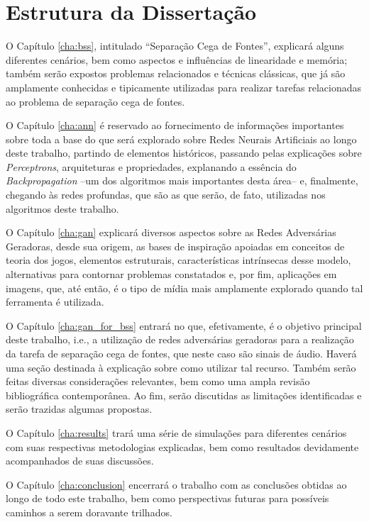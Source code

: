 \section{Estrutura da Dissertação}
\label{sec:intro_dissertation_structure}

O Capítulo \ref{cha:bss}, intitulado ``Separação Cega de Fontes'', explicará alguns diferentes cenários, bem como aspectos e influências de linearidade e memória; também  serão expostos problemas relacionados e técnicas clássicas, que já são amplamente conhecidas e tipicamente utilizadas para realizar tarefas relacionadas ao problema de separação cega de fontes.

O Capítulo \ref{cha:ann} é reservado ao fornecimento de informações importantes sobre toda a base do que será explorado sobre Redes Neurais Artificiais ao longo deste trabalho, partindo de elementos históricos, passando pelas explicações sobre \textit{Perceptrons}, arquiteturas e propriedades, explanando a essência do \textit{Backpropagation} --um dos algoritmos mais importantes desta área-- e, finalmente, chegando às redes profundas, que são as que serão, de fato, utilizadas nos algoritmos deste trabalho.

O Capítulo \ref{cha:gan} explicará diversos aspectos sobre as Redes Adversárias Geradoras, desde sua origem, as bases de inspiração apoiadas em conceitos de teoria dos jogos, elementos estruturais, características intrínsecas desse modelo, alternativas para contornar problemas constatados e, por fim, aplicações em imagens, que, até então, é o tipo de mídia mais amplamente explorado quando tal ferramenta é utilizada.

O Capítulo \ref{cha:gan_for_bss} entrará no que, efetivamente, é o objetivo principal deste trabalho, i.e., a utilização de redes adversárias geradoras para a realização da tarefa de separação cega de fontes, que neste caso são sinais de áudio. Haverá uma seção destinada à explicação sobre como utilizar tal recurso. Também serão feitas diversas considerações relevantes, bem como uma ampla revisão bibliográfica contemporânea. Ao fim, serão discutidas as limitações identificadas e serão trazidas algumas propostas.

O Capítulo \ref{cha:results} trará uma série de simulações para diferentes cenários com suas respectivas metodologias explicadas, bem como resultados devidamente acompanhados de suas discussões.

O Capítulo \ref{cha:conclusion} encerrará o trabalho com as conclusões obtidas ao longo de todo este trabalho, bem como perspectivas futuras para possíveis caminhos a serem doravante trilhados.

